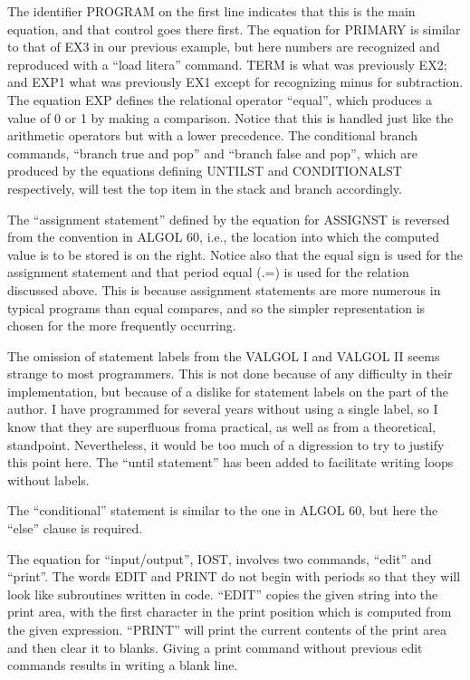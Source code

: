 \documentclass[twocolumn]{article}
\begin{document}
The identifier PROGRAM on the first line indicates that this is the main
equation, and that control goes there first.
The equation for PRIMARY is similar to that of EX3 in our previous example,
but here numbers are recognized and reproduced with a ``load litera'' command.
TERM is what was previously EX2; and EXP1 what was previously EX1 except for
recognizing minus for subtraction.
The equation EXP defines the relational operator ``equal'', which produces a
value of 0 or 1 by making a comparison.
Notice that this is handled just like the arithmetic operators but with a
lower precedence. The conditional branch commands, ``branch true and pop'' and
``branch false and pop'', which are produced by the equations defining UNTILST
and CONDITIONALST respectively, will test the top item in the stack and branch
accordingly.

The ``assignment statement'' defined by the equation for ASSIGNST is reversed
from the convention in ALGOL 60, i.e., the location into which the computed 
value is to be stored is on the right.
Notice also that the equal sign is used for the assignment statement and that
period equal (.=) is used for the relation discussed above.
This is because assignment statements are more numerous in typical programs than
equal compares, and so the simpler representation is chosen for the more
frequently occurring.

The omission of statement labels from the VALGOL I and VALGOL II seems strange
to most programmers. This is not done because of any difficulty in their
implementation, but because of a dislike for statement labels on the part of
the author. I have programmed for several years without using a single label,
so I know that they are superfluous froma practical, as well as from a
theoretical, standpoint.
Nevertheless, it would be too much of a digression to try to justify this point
here.
The ``until statement'' has been added to facilitate writing loops without labels.

The ``conditional'' statement is similar to the one in ALGOL 60, but here the
``else'' clause is required.

The equation for ``input/output'', IOST, involves two commands, ``edit'' and 
``print''.
The words EDIT and PRINT do not begin with periods so that they will look like
subroutines written in code.
``EDIT'' copies the given string into the print area, with the first character
in the print position which is computed from the given expression.
``PRINT'' will print the current contents of the print area and then clear it
to blanks.
Giving a print command without previous edit commands results in writing a blank
line.
\end{document}

